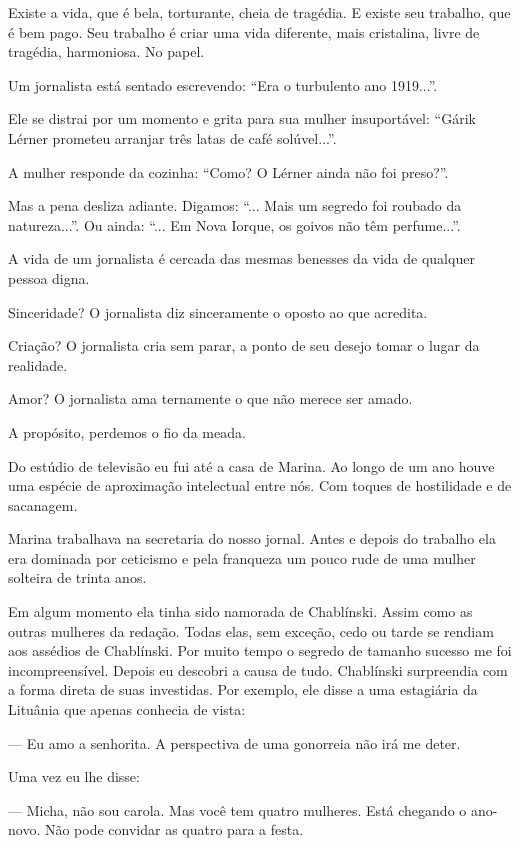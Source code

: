 Existe a vida, que é bela, torturante, cheia de tragédia. E existe seu
trabalho, que é bem pago. Seu trabalho é criar uma vida diferente, mais
cristalina, livre de tragédia, harmoniosa. No papel.

Um jornalista está sentado escrevendo: ``Era o turbulento ano 1919...''.

Ele se distrai por um momento e grita para sua mulher insuportável:
``Gárik Lérner prometeu arranjar três latas de café solúvel...''.

A mulher responde da cozinha: ``Como? O Lérner ainda não foi preso?''.

Mas a pena desliza adiante. Digamos: ``... Mais um segredo foi roubado
da natureza...''. Ou ainda: ``... Em Nova Iorque, os goivos não têm
perfume...''.

A vida de um jornalista é cercada das mesmas benesses da vida de
qualquer pessoa digna.

Sinceridade? O jornalista diz sinceramente o oposto ao que acredita.

Criação? O jornalista cria sem parar, a ponto de seu desejo tomar o
lugar da realidade.

Amor? O jornalista ama ternamente o que não merece ser amado.

A propósito, perdemos o fio da meada.

Do estúdio de televisão eu fui até a casa de Marina. Ao longo de um ano
houve uma espécie de aproximação intelectual entre nós. Com toques de
hostilidade e de sacanagem.

Marina trabalhava na secretaria do nosso jornal. Antes e depois do
trabalho ela era dominada por ceticismo e pela franqueza um pouco rude
de uma mulher solteira de trinta anos.

Em algum momento ela tinha sido namorada de Chablínski. Assim como as
outras mulheres da redação. Todas elas, sem exceção, cedo ou tarde se
rendiam aos assédios de Chablínski. Por muito tempo o segredo de tamanho
sucesso me foi incompreensível. Depois eu descobri a causa de tudo.
Chablínski surpreendia com a forma direta de suas investidas. Por
exemplo, ele disse a uma estagiária da Lituânia que apenas conhecia de
vista:

--- Eu amo a senhorita. A perspectiva de uma gonorreia não irá me deter.

Uma vez eu lhe disse:

--- Micha, não sou carola. Mas você tem quatro mulheres. Está chegando o
ano-novo. Não pode convidar as quatro para a festa.

